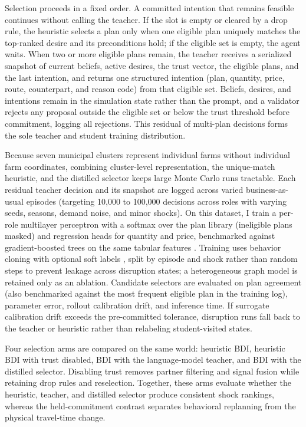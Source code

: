 \documentclass{icsthesis}
\begin{document}
\begin{mainmatter}
			Selection proceeds in a fixed order. A committed intention that remains feasible continues without calling the teacher. If the slot is empty or cleared by a drop rule, the heuristic selects a plan only when one eligible plan uniquely matches the top-ranked desire and its preconditions hold; if the eligible set is empty, the agent waits. When two or more eligible plans remain, the teacher receives a serialized snapshot of current beliefs, active desires, the trust vector, the eligible plans, and the last intention, and returns one structured intention (plan, quantity, price, route, counterpart, and reason code) from that eligible set. Beliefs, desires, and intentions remain in the simulation state rather than the prompt, and a validator rejects any proposal outside the eligible set or below the trust threshold before commitment, logging all rejections. This residual of multi-plan decisions forms the sole teacher and student training distribution.

			Because seven municipal clusters represent individual farms without individual farm coordinates, combining cluster-level representation, the unique-match heuristic, and the distilled selector keeps large Monte Carlo runs tractable. Each residual teacher decision and its snapshot are logged across varied business-as-usual episodes (targeting 10,000 to 100,000 decisions across roles with varying seeds, seasons, demand noise, and minor shocks). On this dataset, I train a per-role multilayer perceptron with a softmax over the plan library (ineligible plans masked) and regression heads for quantity and price, benchmarked against gradient-boosted trees on the same tabular features \citep{Grinsztajn2022}. Training uses behavior cloning with optional soft labels \citep{Hinton2015}, split by episode and shock rather than random steps to prevent leakage across disruption states; a heterogeneous graph model is retained only as an ablation. Candidate selectors are evaluated on plan agreement (also benchmarked against the most frequent eligible plan in the training log), parameter error, rollout calibration drift, and inference time. If surrogate calibration drift exceeds the pre-committed tolerance, disruption runs fall back to the teacher or heuristic rather than relabeling student-visited states.

			Four selection arms are compared on the same world: heuristic BDI, heuristic BDI with trust disabled, BDI with the language-model teacher, and BDI with the distilled selector. Disabling trust removes partner filtering and signal fusion while retaining drop rules and reselection. Together, these arms evaluate whether the heuristic, teacher, and distilled selector produce consistent shock rankings, whereas the held-commitment contrast separates behavioral replanning from the physical travel-time change.


\end{mainmatter}
\end{document}
